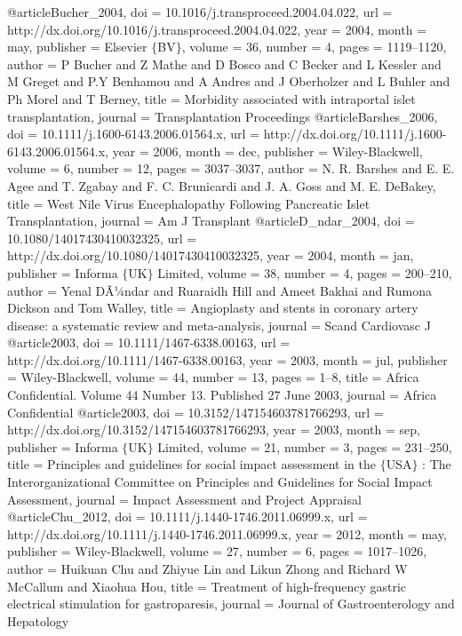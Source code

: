 @article{Bucher_2004,
	doi = {10.1016/j.transproceed.2004.04.022},
	url = {http://dx.doi.org/10.1016/j.transproceed.2004.04.022},
	year = 2004,
	month = {may},
	publisher = {Elsevier $\lbrace$BV$\rbrace$},
	volume = {36},
	number = {4},
	pages = {1119--1120},
	author = {P Bucher and Z Mathe and D Bosco and C Becker and L Kessler and M Greget and P.Y Benhamou and A Andres and J Oberholzer and L Buhler and Ph Morel and T Berney},
	title = {Morbidity associated with intraportal islet transplantation},
	journal = {Transplantation Proceedings}
}
@article{Barshes_2006,
	doi = {10.1111/j.1600-6143.2006.01564.x},
	url = {http://dx.doi.org/10.1111/j.1600-6143.2006.01564.x},
	year = 2006,
	month = {dec},
	publisher = {Wiley-Blackwell},
	volume = {6},
	number = {12},
	pages = {3037--3037},
	author = {N. R. Barshes and E. E. Agee and T. Zgabay and F. C. Brunicardi and J. A. Goss and M. E. DeBakey},
	title = {West Nile Virus Encephalopathy Following Pancreatic Islet Transplantation},
	journal = {Am J Transplant}
}
@article{D_ndar_2004,
	doi = {10.1080/14017430410032325},
	url = {http://dx.doi.org/10.1080/14017430410032325},
	year = 2004,
	month = {jan},
	publisher = {Informa $\lbrace$UK$\rbrace$ Limited},
	volume = {38},
	number = {4},
	pages = {200--210},
	author = {Yenal DÃ¼ndar and Ruaraidh Hill and Ameet Bakhai and Rumona Dickson and Tom Walley},
	title = {Angioplasty and stents in coronary artery disease: a systematic review and meta-analysis},
	journal = {Scand Cardiovasc J}
}
@article{2003,
	doi = {10.1111/1467-6338.00163},
	url = {http://dx.doi.org/10.1111/1467-6338.00163},
	year = 2003,
	month = {jul},
	publisher = {Wiley-Blackwell},
	volume = {44},
	number = {13},
	pages = {1--8},
	title = {Africa Confidential. Volume 44 Number 13. Published 27 June 2003},
	journal = {Africa Confidential}
}
@article{2003,
	doi = {10.3152/147154603781766293},
	url = {http://dx.doi.org/10.3152/147154603781766293},
	year = 2003,
	month = {sep},
	publisher = {Informa $\lbrace$UK$\rbrace$ Limited},
	volume = {21},
	number = {3},
	pages = {231--250},
	title = {Principles and guidelines for social impact assessment in the $\lbrace$USA$\rbrace$ : The Interorganizational Committee on Principles and Guidelines for Social Impact Assessment},
	journal = {Impact Assessment and Project Appraisal}
}
@article{Chu_2012,
	doi = {10.1111/j.1440-1746.2011.06999.x},
	url = {http://dx.doi.org/10.1111/j.1440-1746.2011.06999.x},
	year = 2012,
	month = {may},
	publisher = {Wiley-Blackwell},
	volume = {27},
	number = {6},
	pages = {1017--1026},
	author = {Huikuan Chu and Zhiyue Lin and Likun Zhong and Richard W McCallum and Xiaohua Hou},
	title = {Treatment of high-frequency gastric electrical stimulation for gastroparesis},
	journal = {Journal of Gastroenterology and Hepatology}
}
